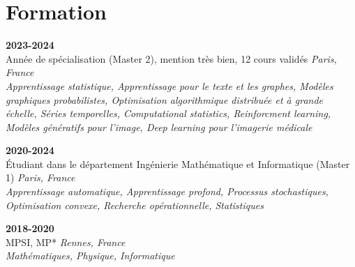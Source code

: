 \section{Formation}
\vspace{0.1cm}

  \hfill \textbf{2023-2024}\\
Année de spécialisation (Master 2), mention très bien, 12 cours validés \hfill \textit{Paris, France}\\
\textit{Apprentissage statistique, Apprentissage pour le texte et les graphes, Modèles graphiques probabilistes, Optimisation algorithmique distribuée et à grande échelle, Séries temporelles, Computational statistics, Reinforcment learning, Modèles génératifs pour l'image, Deep learning pour l'imagerie médicale}

\vspace{0.1cm}

  \hfill \textbf{2020-2024}\\
Étudiant dans le département Ingénierie Mathématique et Informatique (Master 1) \hfill \textit{Paris, France}\\
\textit{Apprentissage automatique, Apprentissage profond, Processus stochastiques, Optimisation convexe, Recherche opérationnelle, Statistiques}

\vspace{0.1cm}

 \hfill \textbf{2018-2020}\\
MPSI, MP* \hfill \textit{Rennes, France}\\
\textit{Mathématiques, Physique, Informatique}\\
